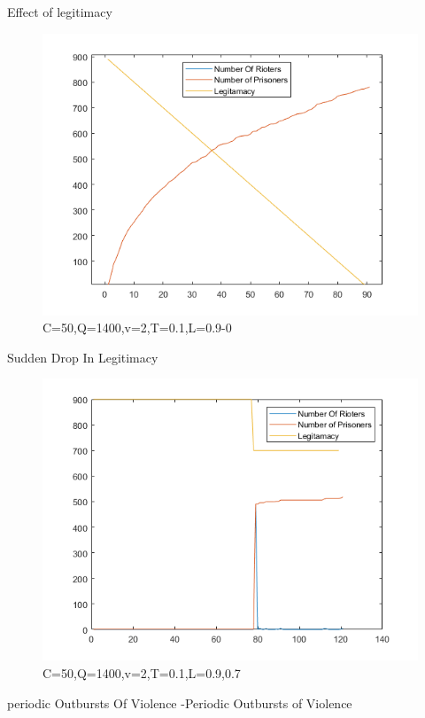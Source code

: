 \documentclass[final,hyperref={pdfpagelabels=false}]{beamer}
\begin{document}
\begin{frame}[t]
\begin{columns}[t]
\begin{column}{.3\textwidth}
\begin{block}{Effect of legitimacy}
					\begin{figure}[H]
						\includegraphics[width=\linewidth]{effect of Legitamacy reduction.png}
						\caption{C=50,Q=1400,v=2,T=0.1,L=0.9-0}
						\label{fig:yu}
					\end{figure}
					Sudden Drop In Legitimacy
					\begin{figure}[H]
					\includegraphics[width=\linewidth]{sudden effect of Legitamacy reduction.png}
					\caption{C=50,Q=1400,v=2,T=0.1,L=0.9,0.7}
					\label{fig:frenchriot}
				\end{figure}
					\end{block}
			\begin{block}{periodic Outbursts Of Violence}
					-Periodic Outbursts of Violence

\end{block}
\end{column}
\end{columns}
\end{frame}
\end{document}
